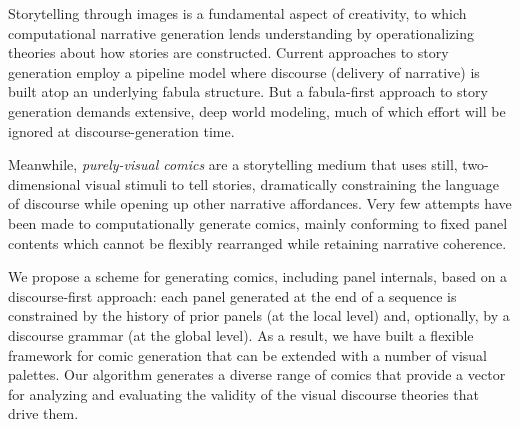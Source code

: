 Storytelling through images is a fundamental aspect of creativity, to which
computational narrative generation lends understanding by operationalizing
theories about how stories are constructed.  Current approaches to story
generation employ a pipeline model where discourse (delivery of narrative)
is built atop an underlying fabula structure. But a fabula-first approach
to story generation demands extensive, deep world modeling, much of which
effort will be ignored at discourse-generation time. 

Meanwhile, {\em
purely-visual comics} are a storytelling medium that uses still,
two-dimensional visual stimuli to tell stories, dramatically constraining
the language of discourse while opening up other narrative affordances.
Very few attempts have been made to computationally generate comics, mainly
conforming to fixed panel contents which cannot be flexibly rearranged
while retaining narrative coherence.

We propose a scheme for generating comics, including panel internals, based
on a discourse-first approach: each panel generated at the end of a
sequence is constrained by the history of prior panels (at the local level)
and, optionally, by a discourse grammar (at the global level).
As a result, we have built a flexible framework for comic generation that
can be extended with a number of visual palettes. Our algorithm generates a
diverse range of comics that provide a vector for analyzing and evaluating
the validity of the visual discourse theories that drive them.

